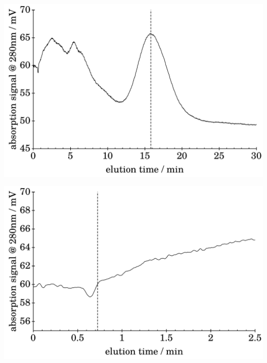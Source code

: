 \needspace{10em}
\clearpage
\setcounter{subfigure}{0}
\begin{minipage}{\linewidth}
  \begin{center}
    \begin{minipage}{\subFigSize}
      \includegraphics[width=\linewidth]{./images/data/rawPlots/img_PS_VC_05_rep1_te_UV.pdf}
      \label{subfig:raw_PS2_5_r1_te_UV}
    \end{minipage}
    \begin{minipage}{\subFigSize}
      \includegraphics[width=\linewidth]{./images/data/rawPlots/img_PS_VC_05_rep1_t0_UV.pdf}

\end{minipage}
\end{center}
\end{minipage}
